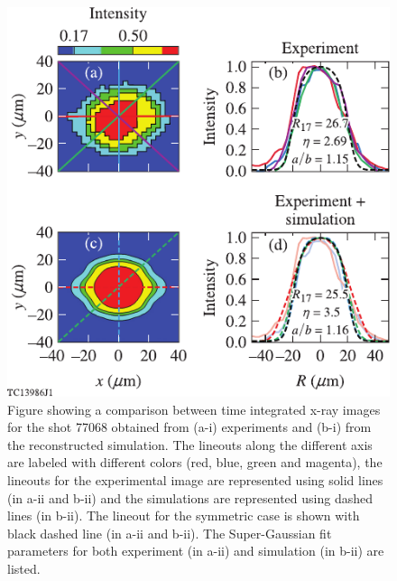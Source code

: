 \documentclass[aip,reprint]{revtex4-1}
\begin{document}
\begin{figure}
\includegraphics{Fig11_Bose}
\caption{\label{fig:Exp_shape2} Figure showing a comparison between time integrated x-ray images for the shot 77068 obtained from (a-i) experiments and (b-i) from the reconstructed simulation. The lineouts along the different axis are labeled with different colors (red, blue, green and magenta), the lineouts for the experimental image are represented using solid lines (in a-ii and b-ii) and the simulations are represented using dashed lines (in b-ii). The lineout for the symmetric case is shown with black dashed line (in a-ii and b-ii). The Super-Gaussian fit parameters for both experiment (in a-ii) and simulation (in b-ii) are listed.}
\end{figure}
%
\end{document}
